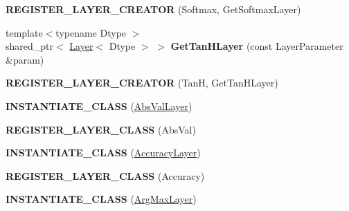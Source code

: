 \begin{DoxyCompactItemize}
\item 
{\bfseries R\+E\+G\+I\+S\+T\+E\+R\+\_\+\+L\+A\+Y\+E\+R\+\_\+\+C\+R\+E\+A\+T\+OR} (Softmax, Get\+Softmax\+Layer)\hypertarget{namespacecaffe_a4c3902ad7054d947a125bb85e541b821}{}\label{namespacecaffe_a4c3902ad7054d947a125bb85e541b821}

\item 
{\footnotesize template$<$typename Dtype $>$ }\\shared\+\_\+ptr$<$ \hyperlink{classcaffe_1_1Layer}{Layer}$<$ Dtype $>$ $>$ {\bfseries Get\+Tan\+H\+Layer} (const Layer\+Parameter \&param)\hypertarget{namespacecaffe_a70147f6cc08d1048102c66a17f24dddb}{}\label{namespacecaffe_a70147f6cc08d1048102c66a17f24dddb}

\item 
{\bfseries R\+E\+G\+I\+S\+T\+E\+R\+\_\+\+L\+A\+Y\+E\+R\+\_\+\+C\+R\+E\+A\+T\+OR} (TanH, Get\+Tan\+H\+Layer)\hypertarget{namespacecaffe_a539c5ac72c92bf0b70c0af4e4815db39}{}\label{namespacecaffe_a539c5ac72c92bf0b70c0af4e4815db39}

\item 
{\bfseries I\+N\+S\+T\+A\+N\+T\+I\+A\+T\+E\+\_\+\+C\+L\+A\+SS} (\hyperlink{classcaffe_1_1AbsValLayer}{Abs\+Val\+Layer})\hypertarget{namespacecaffe_a76d094142b0dff5d4dcfb194a28420f2}{}\label{namespacecaffe_a76d094142b0dff5d4dcfb194a28420f2}

\item 
{\bfseries R\+E\+G\+I\+S\+T\+E\+R\+\_\+\+L\+A\+Y\+E\+R\+\_\+\+C\+L\+A\+SS} (Abs\+Val)\hypertarget{namespacecaffe_a63635ae48c944a9f8d0cea9a869b4f8a}{}\label{namespacecaffe_a63635ae48c944a9f8d0cea9a869b4f8a}

\item 
{\bfseries I\+N\+S\+T\+A\+N\+T\+I\+A\+T\+E\+\_\+\+C\+L\+A\+SS} (\hyperlink{classcaffe_1_1AccuracyLayer}{Accuracy\+Layer})\hypertarget{namespacecaffe_ac8b27282f180a29b393ce42c9bd73998}{}\label{namespacecaffe_ac8b27282f180a29b393ce42c9bd73998}

\item 
{\bfseries R\+E\+G\+I\+S\+T\+E\+R\+\_\+\+L\+A\+Y\+E\+R\+\_\+\+C\+L\+A\+SS} (Accuracy)\hypertarget{namespacecaffe_a4374c9848cea851faf1f249c07205359}{}\label{namespacecaffe_a4374c9848cea851faf1f249c07205359}

\item 
{\bfseries I\+N\+S\+T\+A\+N\+T\+I\+A\+T\+E\+\_\+\+C\+L\+A\+SS} (\hyperlink{classcaffe_1_1ArgMaxLayer}{Arg\+Max\+Layer})\hypertarget{namespacecaffe_a0aa37e233ff0e29d43d94055982c0cf5}{}\label{namespacecaffe_a0aa37e233ff0e29d43d94055982c0cf5}


\end{DoxyCompactItemize}
